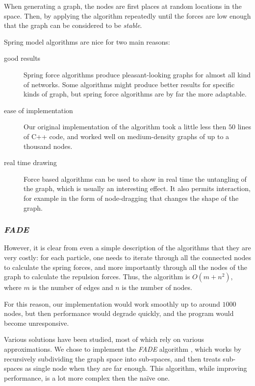 \documentclass[a4paper,11pt,titlepage]{article}
\newcommand{\buzz}[1]{\emph{#1}}
\newcommand{\FADE}{\buzz{FADE} }
\begin{document}
When generating a graph, the nodes are first places at random
locations in the space. Then, by applying the algorithm repeatedly
until the forces are low enough that the graph can be considered to be
\emph{stable}.

Spring model algorithms are nice for two main reasons:

\begin{description}
\item [good results] Spring force algorithms produce pleasant-looking
  graphs for almost all kind of networks. Some algorithms might
  produce better results for specific kinds of graph, but spring force
  algorithms are by far the more adaptable.

\item [ease of implementation] Our original implementation of the
  algorithm took a little less then $50$ lines of C++ code, and worked
  well on medium-density graphs of up to a thousand nodes.

\item [real time drawing] Force based algorithms can be used to show
  in real time the untangling of the graph, which is usually an
  interesting effect. It also permits interaction, for example in the
  form of node-dragging that changes the shape of the graph.
\end{description}

\subsubsection{\FADE}

However, it is clear from even a simple description of the algorithms
that they are very costly: for each particle, one needs to iterate
through all the connected nodes to calculate the spring forces, and
more importantly through all the nodes of the graph to calculate the
repulsion forces. Thus, the algorithm is $O(m + n^2)$, where $m$ is
the number of edges and $n$ is the number of nodes.

For this reason, our implementation would work smoothly up to around
$1000$ nodes, but then performance would degrade quickly, and the
program would become unresponsive.

Various solutions have been studied, most of which rely on various
approximations. We chose to implement the \FADE algorithm \cite{fade},
which works by recursively subdividing the graph space into
sub-spaces, and then treats sub-spaces as single node when they are
far enough. This algorithm, while improving performance, is a lot more
complex then the na\"ive one.
\end{document}
